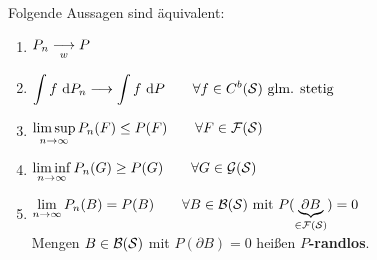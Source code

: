 \begin{satz}\enter\label{satz4.2}
Folgende Aussagen sind äquivalent:
\begin{enumerate}[label=(\arabic*)]
\item $\begin{aligned}
P_n\underset{w}{\overset{}{\longrightarrow}} P
\end{aligned}$
\item $\begin{aligned}
\int\limits f\text{ d} P_n\stackrel{}{\longrightarrow}\int\limits f\text{ d} P\qquad\forall f\in C^b(\mathcal{S})\text{ glm. stetig}
\end{aligned}$
\item $\begin{aligned}
\limsup\limits_{n\to\infty} P_n(F)\leq P(F)\qquad\forall F\in\mathcal{F}(\mathcal{S})
\end{aligned}$
\item $\begin{aligned}
\liminf\limits_{n\to\infty} P_n(G)\geq P(G)\qquad\forall G\in\mathcal{G}(\mathcal{S})
\end{aligned}$
\item $\begin{aligned}
\lim\limits_{n\to\infty} P_n(B)=P(B)\qquad\forall B\in\mathcal{B}(\mathcal{S})\text{ mit } P(\underbrace{\partial B}_{\in\mathcal{F}(\mathcal{S})})=0
\end{aligned}$\\
Mengen $B\in\mathcal{B}(\mathcal{S})$ mit $P(\partial B)=0$ heißen \textbf{$P$-randlos}.
\end{enumerate}
\end{satz}
